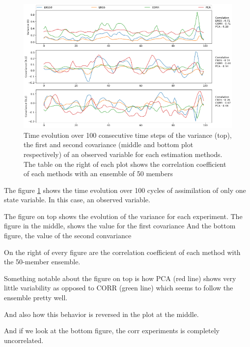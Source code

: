 \documentclass[num-refs]{wiley-article}
\begin{document}
\begin{figure}[hbt!]
        \includegraphics[width=\textwidth]{images/evolObsPCA.png}
        \caption{Time evolution over 100 consecutive time steps of the variance (top), the first and second covariance (middle and bottom plot respectively) of an observed variable for each estimation methods. The table on the right of each plot shows the correlation coefficient of each methods with an ensemble of 50 members }
\label{FIG:EVOLOBSPCA}
\end{figure}

The figure \ref{FIG:EVOLOBSPCA} shows the time evolution over 100 cycles of assimilation of only one state variable. In this case, an observed variable. 

The figure on top shows the evolution of the variance for each experiment. The figure in the middle, shows the value for the first covariance 
And the bottom figure, the value of  the second convariance

On the right of every figure  are the correlation coefficient of each method with the 50-member ensemble.

Something  notable about the figure on top is how PCA (red line) shows very little variability as opposed to CORR (green line) which seems to follow the ensemble pretty well.  

And also how this behavior is reversed in  the plot at the middle.

And if we look at the bottom figure, the corr experiments is completely uncorrelated.
\end{document}
